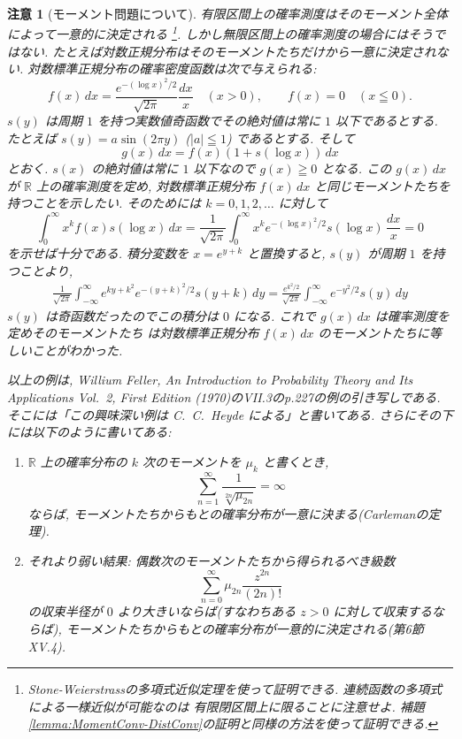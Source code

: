 \documentclass[12pt,twoside]{jarticle}
\newcommand\R{{\mathbb R}} %
\theoremstyle{jplain}
\theoremstyle{jplain}
\theoremstyle{jplain}
\newtheorem{remark}[theorem]{注意}
\numberwithin{theorem}{section}
\numberwithin{equation}{section}
\numberwithin{figure}{section}
\numberwithin{table}{section}
\newcommand\lemmaref[1]{補題\ref{#1}}
\begin{document}
\begin{remark}[モーメント問題について]
有限区間上の確率測度はそのモーメント全体によって一意的に決定される%
\footnote{Stone-Weierstrassの多項式近似定理を使って証明できる.
連続函数の多項式による一様近似が可能なのは
有限閉区間上に限ることに注意せよ.
\lemmaref{lemma:MomentConv-DistConv}の証明と同様の方法を使って証明できる.}.
しかし無限区間上の確率測度の場合にはそうではない.
たとえば対数正規分布はそのモーメントたちだけから一意に決定されない.
対数標準正規分布の確率密度函数は次で与えられる:
\[
f(x)\,dx = \frac{e^{-(\log x)^2/2}}{\sqrt{2\pi}}\frac{dx}{x} \quad (x>0),
\qquad f(x)=0 \quad (x\leqq 0).
\]
$s(y)$ は周期 $1$ を持つ実数値奇函数でその絶対値は常に $1$ 以下であるとする.
たとえば $s(y)=a\sin(2\pi y)$ ($|a|\leqq 1$) であるとする. そして 
\[
g(x)\,dx=f(x)(1+s(\log x))\,dx
\]
とおく. $s(x)$ の絶対値は常に $1$ 以下なので $g(x)\geqq 0$ となる.
この $g(x)\,dx$ が $\R$ 上の確率測度を定め, 
対数標準正規分布 $f(x)\,dx$ と同じモーメントたちを持つことを示したい. 
そのためには $k=0,1,2,\ldots$ に対して
\[
\int_0^\infty x^k f(x)s(\log x)\,dx 
= \frac{1}{\sqrt{2\pi}}\int_0^\infty 
x^k e^{-(\log x)^2/2} s(\log x)\,\frac{dx}{x}
= 0
\]
を示せば十分である. 積分変数を $x=e^{y+k}$ と置換すると,
$s(y)$ が周期 $1$ を持つことより, 
\begin{align*}
\frac{1}{\sqrt{2\pi}}\int_{-\infty}^\infty 
e^{ky+k^2}e^{-(y+k)^2/2}s(y+k)\,dy
=
\frac{e^{k^2/2}}{\sqrt{2\pi}}
\int_{-\infty}^\infty e^{-y^2/2}s(y)\,dy
\end{align*}
$s(y)$ は奇函数だったのでこの積分は $0$ になる.
これで $g(x)\,dx$ は確率測度を定めそのモーメントたち
は対数標準正規分布 $f(x)\,dx$ のモーメントたちに等しいことがわかった.

以上の例は, 
Willium Feller, 
An Introduction to Probability Theory and Its Applications Vol.~2,
First Edition (1970)のVII.3のp.227の例の引き写しである.
そこには「この興味深い例は C.~C.~Heyde による」と書いてある.
さらにその下には以下のように書いてある:
\begin{enumerate}

\item[(1)] $\R$ 上の確率分布の $k$ 次のモーメントを $\mu_k$ と書くとき, 
\[
\sum_{n=1}^\infty \frac{1}{\sqrt[2n]{\mu_{2n}}} = \infty
\]
ならば, モーメントたちからもとの確率分布が一意に決まる(Carlemanの定理).

\item[(2)] それより弱い結果: 偶数次のモーメントたちから得られるべき級数
\[
\sum_{n=0}^\infty \mu_{2n}\frac{z^{2n}}{(2n)!}
\]
の収束半径が $0$ より大きいならば(すなわちある $z>0$ に対して収束するならば), 
モーメントたちからもとの確率分布が一意的に決定される(第6節XV.4).


\end{enumerate}
\end{remark}
\end{document}

